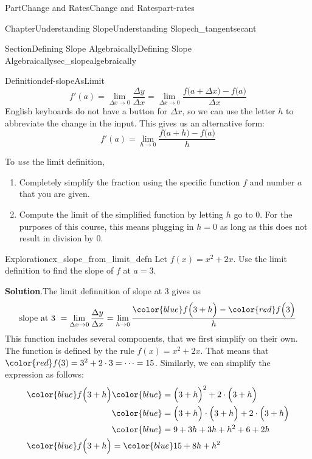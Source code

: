 \documentclass[oneside,10pt,]{tufte-book}
\newcommand{\blocktitlefont}{\relax}
\numberwithin{equation}{chapter}
\newcommand{\amp}{&}
\begin{document}
\begin{partptx}{Part}{Change and Rates}{}{Change and Rates}{}{}{part-rates}
\begin{chapterptx}{Chapter}{Understanding Slope}{}{Understanding Slope}{}{}{ch_tangentsecant}
\begin{sectionptx}{Section}{Defining Slope Algebraically}{}{Defining Slope Algebraically}{}{}{sec_slopealgebraically}
\begin{definition}{Definition}{}{def-slopeAsLimit}
\begin{equation*}
f'(a) = \lim_{\Delta x\rightarrow 0}\dfrac{\Delta y}{\Delta x} = \lim_{\Delta x\rightarrow 0} \dfrac{ f\Big(a+\Delta x\Big) - f\Big(a\Big) }{\Delta x} 
\end{equation*}
English keyboards do not have a button for \(\Delta x\), so we can use the letter \(h\) to abbreviate the change in the input.  This gives us an alternative form:%
\begin{equation*}
f'(a) = \displaystyle \lim_{h\rightarrow 0}\dfrac{f\Big(a+h\Big) - f\Big(a\Big) }{h} 
\end{equation*}
%
\end{definition}
To \emph{use} the limit definition,%
\begin{enumerate}
\item{}Completely simplify the fraction using the specific function \(f\) and number \(a\) that you are given.%
\item{}Compute the limit of the simplified function by letting \(h\) go to \(0\). For the purposes of this course, this means plugging in \(h=0\) as long as this does not result in division by \(0\).%
\end{enumerate}
%
\begin{exploration}{Exploration}{}{ex_slope_from_limit_defn}%
Let \(f(x) = x^2 + 2x\). Use the limit definition to find the slope of \(f\) at \(a=3\).%
\par\smallskip%
\noindent\textbf{\blocktitlefont Solution}.\hypertarget{ex_slope_from_limit_defn-2}{}\quad{}The limit definnition of slope at \(3\) gives us%
\begin{equation*}
\text{slope at 3 } = \lim_{\Delta x\rightarrow 0} \dfrac{\Delta y}{\Delta x} = \lim_{h\rightarrow 0} \dfrac{ {\color{blue}f\Big(3+h\Big)} - {\color{red} f\Big(3\Big)}}{h}
\end{equation*}
This function includes several components, that we first simplify on their own. The function is defined by the rule  \(f(x) = x^2 + 2x\).  That means that \(\color{red} f(3) = 3^2 + 2\cdot 3 = \dots = 15\). Similarly, we can simplify the expression as follows:%
\begin{align*}
\color{blue} f\Big(3+h\Big) \amp \color{blue} = \Big(3+h\Big)^2 + 2\cdot \Big(3+h\Big) \\
\amp \color{blue} = \Big(3+h\Big)\cdot\Big(3+h\Big)  + 2\cdot \Big(3+h\Big) \\
\amp \color{blue} = 9 + 3h + 3h + h^2 + 6 + 2h  \\
\color{blue} f\Big(3+h\Big) \amp = \color{blue} 15 + 8h + h^2   

\end{align*}
\end{exploration}
\end{sectionptx}
\end{chapterptx}
\end{partptx}
\end{document}
